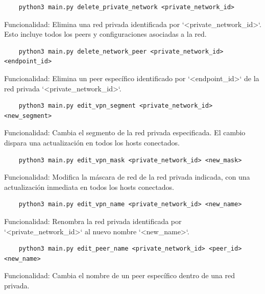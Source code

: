    
    
    \begin{verbatim}
    python3 main.py delete_private_network <private_network_id>
    \end{verbatim}
    Funcionalidad:  
    Elimina una red privada identificada por `<private_network_id>`. Esto incluye todos los peers y configuraciones asociadas a la red.
    
    \begin{verbatim}
    python3 main.py delete_network_peer <private_network_id> <endpoint_id>
    \end{verbatim}
    Funcionalidad:  
    Elimina un peer específico identificado por `<endpoint_id>` de la red privada `<private_network_id>`.
    
   
    
    \begin{verbatim}
    python3 main.py edit_vpn_segment <private_network_id> <new_segment>
    \end{verbatim}
    Funcionalidad:  
    Cambia el segmento de la red privada especificada. El cambio dispara una actualización en todos los hosts conectados.
    
    \begin{verbatim}
    python3 main.py edit_vpn_mask <private_network_id> <new_mask>
    \end{verbatim}
    Funcionalidad:  
    Modifica la máscara de red de la red privada indicada, con una actualización inmediata en todos los hosts conectados.
    
    \begin{verbatim}
    python3 main.py edit_vpn_name <private_network_id> <new_name>
    \end{verbatim}
    Funcionalidad:  
    Renombra la red privada identificada por `<private_network_id>` al nuevo nombre `<new_name>`.
    
   
    
    \begin{verbatim}
    python3 main.py edit_peer_name <private_network_id> <peer_id> <new_name>
    \end{verbatim}
    Funcionalidad:  
    Cambia el nombre de un peer específico dentro de una red privada.
    
